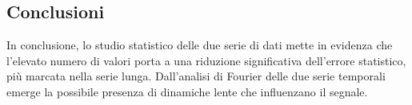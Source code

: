 \subsection{Conclusioni}
In conclusione, lo studio statistico delle due serie di dati mette in evidenza che l'elevato numero di valori porta a una riduzione significativa dell'errore statistico, più marcata nella serie lunga. Dall'analisi di Fourier delle due serie temporali emerge la possibile presenza di dinamiche lente che influenzano il segnale. 